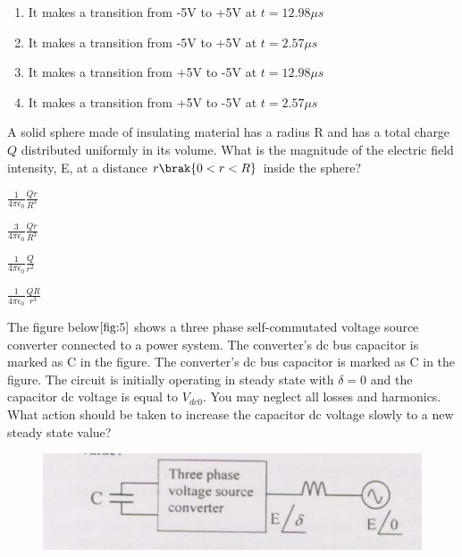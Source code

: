 \begin{enumerate}
    \item It makes a transition from -5V to +5V at $t=12.98\mu s$
    \item It makes a transition from -5V to +5V at $t=2.57\mu s$
    \item It makes a transition from +5V to -5V at $t=12.98\mu s$
    \item It makes a transition from +5V to -5V at $t=2.57\mu s$

\end{enumerate}
\bigskip
\item A solid sphere made of insulating material has a radius R and has a total charge $Q$ distributed uniformly in its volume. What is the magnitude of the electric field intensity, E, at a distance $r\brak{0<r<R}$ inside the sphere?
\begin{enumerate}
    \begin{multicols}{4}
        \item $\frac{1}{4\pi\epsilon_0}\frac{Qr}{R^3}$
        \item $\frac{3}{4\pi\epsilon_0}\frac{Qr}{R^3}$
        \item $\frac{1}{4\pi\epsilon_0}\frac{Q}{r^2}$
        \item $\frac{1}{4\pi\epsilon_0}\frac{QR}{r^3}$
    \end{multicols}
\end{enumerate}
\bigskip
\item The figure below$\ref{fig:5}$ shows a three phase self-commutated voltage source converter connected to a power system. The converter's dc bus capacitor is marked as C in the figure. The converter's dc bus capacitor is marked as C in the figure. The circuit is initially operating in steady state with $\delta=0$ and the capacitor dc voltage is equal to $V_{dc0}$. You may neglect all losses and harmonics. What action should be taken to increase the capacitor dc voltage slowly to a new steady state value?
\begin{figure}[!ht]
    \centering
    \includegraphics[width=\linewidth]{GATE-yearwise/Assignment2/figs/5.png}
    \caption{}
    \label{fig:5}
    \end{figure}
